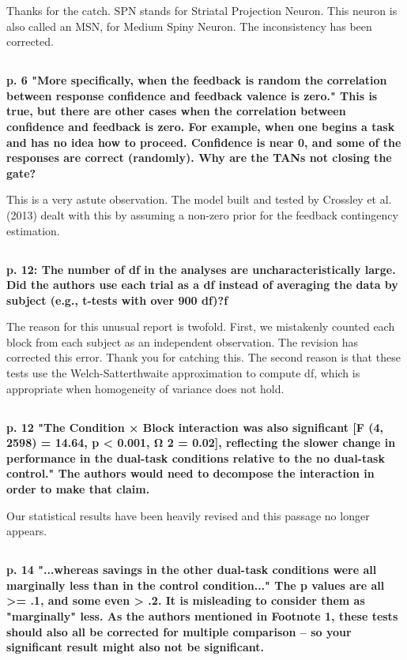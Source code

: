 \documentclass[10pt,a4paper]{article}
\begin{document}
Thanks for the catch. SPN stands for Striatal Projection Neuron. This neuron is also called an MSN, for Medium Spiny Neuron. The inconsistency has been corrected.

\subsection{} \textbf{
  p. 6 "More specifically, when the feedback is random the correlation between
  response confidence and feedback valence is zero." This is true, but there are
  other cases when the correlation between confidence and feedback is zero. For
  example, when one begins a task and has no idea how to proceed. Confidence is
  near 0, and some of the responses are correct (randomly). Why are the TANs not
  closing the gate?
}

This is a very astute observation. The model built and tested by Crossley et al.
(2013) dealt with this by assuming a non-zero prior for the feedback contingency
estimation. 

\subsection{} \textbf{
  p. 12: The number of df in the analyses are uncharacteristically large. Did the
  authors use each trial as a df instead of averaging the data by subject (e.g.,
  t-tests with over 900 df)?f
}

The reason for this unusual report is twofold. First, we mistakenly counted each
block from each subject as an independent observation. The revision has
corrected this error. Thank you for catching this. The second reason is that
these tests use the Welch-Satterthwaite approximation to compute df, which is
appropriate when homogeneity of variance does not hold.

\subsection{} \textbf{
  p. 12 "The Condition × Block interaction was also significant [F (4, 2598) =
  14.64, p < 0.001, Ω 2 = 0.02], reflecting the slower change in performance in
  the dual-task conditions relative to the no dual-task control." The authors
  would need to decompose the interaction in order to make that claim.
}

Our statistical results have been heavily revised and this passage no longer
appears.

\subsection{} \textbf{
  p. 14 "...whereas savings in the other dual-task
  conditions were all marginally less than in the control condition..." The p
  values are all >= .1, and some even > .2. It is misleading to consider them as
  "marginally" less. As the authors mentioned in Footnote 1, these tests should
  also all be corrected for multiple comparison -- so your significant result
  might also not be significant.
}
\end{document}
